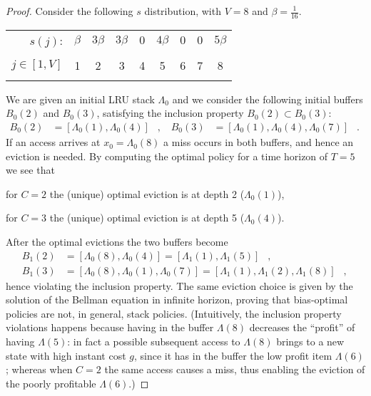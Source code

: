 \documentclass[11pt,a4paper]{article}
\DeclareMathOperator{\mf}{\enspace .}
\DeclareMathOperator{\mc}{\enspace ,}
\theoremstyle{definition}
\theoremstyle{remark}
\begin{document}
\begin{proof}
  Consider the following $s$ distribution, with $V=8$ and $\beta=\frac{1}{16}$.
  \begin{center}
    \begin{tabular}{r|c|c|c|c|c|c|c|c|}
                                                \multicolumn{1}{r|}{$s(j)$:}
      &$\beta$&$3\beta$&$3\beta$&$0$&$4\beta$&$0$&$0$&$5\beta$\\
      \multicolumn{1}{c}{}\\[-3mm]
      \multicolumn{1}{c}{$j\in[1,V]$}& \multicolumn{1}{c}{1}&
      \multicolumn{1}{c}{2}& \multicolumn{1}{c}{3}& \multicolumn{1}{c}{4}&
      \multicolumn{1}{c}{5}& \multicolumn{1}{c}{6}& \multicolumn{1}{c}{7}&
      \multicolumn{1}{c}{8}\\[3mm] \multicolumn{9}{c}{}\\
    \end{tabular}
  \end{center}
  We are given an initial LRU stack $\Lambda_0$ and we consider the following
  initial buffers $B_0(2)$ and $B_0(3)$, satisfying the inclusion property $B_0(2)
  \subset B_0(3)$:
  \begin{align}
    B_0(2)&=\left[\Lambda_0(1), \Lambda_0(4) \right] \mc &
    B_0(3)&=\left[\Lambda_0(1), \Lambda_0(4), \Lambda_0(7) \right] \mf
  \end{align}
  If an access arrives at $x_0=\Lambda_0(8)$ a miss occurs in both buffers, and
  hence an eviction is needed. By computing the optimal policy for a time
  horizon of $T=5$ we see that
  \begin{compactitem}
  \item for $C=2$ the (unique) optimal eviction is at depth 2 ($\Lambda_0(1)$),
  \item for $C=3$ the (unique) optimal eviction is at depth 5 ($\Lambda_0(4)$).
  \end{compactitem}
  After the optimal evictions the two buffers become
  \begin{align}
    B_1(2)&=\left[\Lambda_0(8), \Lambda_0(4) \right] = \left[\Lambda_1(1),
      \Lambda_1(5) \right] \mc \\
    B_1(3)&=\left[\Lambda_0(8), \Lambda_0(1), \Lambda_0(7) \right] =
    \left[\Lambda_1(1), \Lambda_1(2), \Lambda_1(8) \right] \mc
  \end{align}
  hence violating the inclusion property.  The same eviction choice is given by
  the solution of the Bellman equation in infinite horizon, proving that
  bias-optimal policies are not, in general, stack policies.
    (Intuitively, the inclusion property violations happens because having in the
  buffer $\Lambda(8)$ decreases the ``profit'' of having $\Lambda(5)$: in fact a
  possible subsequent access to $\Lambda(8)$ brings to a new state with high
  instant cost $g$, since it has in the buffer the low profit item $\Lambda(6)$;
  whereas when $C=2$ the same access causes a miss, thus enabling the eviction
  of the poorly profitable $\Lambda(6)$.)
                  \end{proof}
\end{document}
